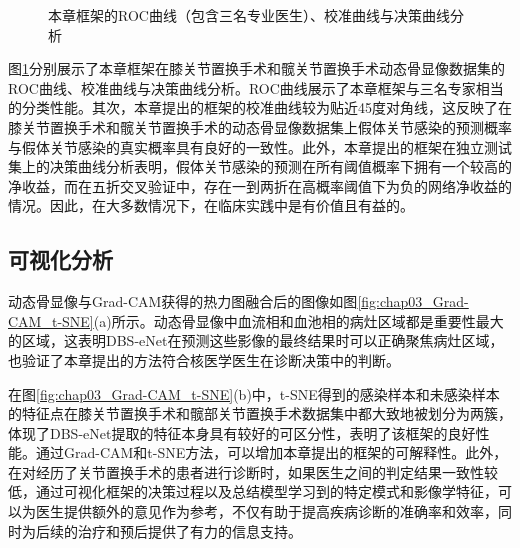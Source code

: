 \begin{figure}[htbp]
  \newline
  \caption{本章框架的ROC曲线（包含三名专业医生）、校准曲线与决策曲线分析}
  \label{fig:chap03_ROC_CC_DAC}
\end{figure}

图\ref{fig:chap03_ROC_CC_DAC}分别展示了本章框架在膝关节置换手术和髋关节置换手术动态骨显像数据集的ROC曲线、校准曲线与决策曲线分析。ROC曲线展示了本章框架与三名专家相当的分类性能。其次，本章提出的框架的校准曲线较为贴近45度对角线，这反映了在膝关节置换手术和髋关节置换手术的动态骨显像数据集上假体关节感染的预测概率与假体关节感染的真实概率具有良好的一致性。此外，本章提出的框架在独立测试集上的决策曲线分析表明，假体关节感染的预测在所有阈值概率下拥有一个较高的净收益，而在五折交叉验证中，存在一到两折在高概率阈值下为负的网络净收益的情况。因此，在大多数情况下，在临床实践中是有价值且有益的。

\subsection{可视化分析}

动态骨显像与Grad-CAM获得的热力图融合后的图像如图\ref{fig:chap03_Grad-CAM_t-SNE}(a)所示。动态骨显像中血流相和血池相的病灶区域都是重要性最大的区域，这表明DBS-eNet在预测这些影像的最终结果时可以正确聚焦病灶区域，也验证了本章提出的方法符合核医学医生在诊断决策中的判断。

在图\ref{fig:chap03_Grad-CAM_t-SNE}(b)中，t-SNE得到的感染样本和未感染样本的特征点在膝关节置换手术和髋部关节置换手术数据集中都大致地被划分为两簇，体现了DBS-eNet提取的特征本身具有较好的可区分性，表明了该框架的良好性能。通过Grad-CAM和t-SNE方法，可以增加本章提出的框架的可解释性。此外，在对经历了关节置换手术的患者进行诊断时，如果医生之间的判定结果一致性较低，通过可视化框架的决策过程以及总结模型学习到的特定模式和影像学特征，可以为医生提供额外的意见作为参考，不仅有助于提高疾病诊断的准确率和效率，同时为后续的治疗和预后提供了有力的信息支持。

